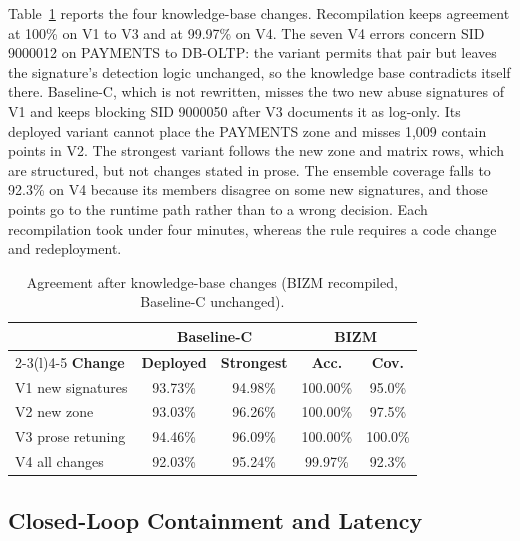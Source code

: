 \documentclass[final,5p]{elsarticle}
\begin{document}
Table~\ref{tab:drift} reports the four knowledge-base changes. Recompilation keeps agreement at 100\% on V1 to V3 and at 99.97\% on V4. The seven V4 errors concern SID 9000012 on PAYMENTS to DB-OLTP: the variant permits that pair but leaves the signature's detection logic unchanged, so the knowledge base contradicts itself there. Baseline-C, which is not rewritten, misses the two new abuse signatures of V1 and keeps blocking SID 9000050 after V3 documents it as log-only. Its deployed variant cannot place the PAYMENTS zone and misses 1,009 contain points in V2. The strongest variant follows the new zone and matrix rows, which are structured, but not changes stated in prose. The ensemble coverage falls to 92.3\% on V4 because its members disagree on some new signatures, and those points go to the runtime path rather than to a wrong decision. Each recompilation took under four minutes, whereas the rule requires a code change and redeployment.

\begin{table}[t]
    \centering
    \caption{Agreement after knowledge-base changes (BIZM recompiled, Baseline-C unchanged).}
    \label{tab:drift}
    \small
    \setlength{\tabcolsep}{2.5pt}
    \begin{tabular}{@{}lcccc@{}}
        \toprule
        & \multicolumn{2}{c}{\textbf{Baseline-C}} & \multicolumn{2}{c}{\textbf{BIZM}} \\
        \cmidrule(lr){2-3}\cmidrule(l){4-5}
        \textbf{Change} & \textbf{Deployed} & \textbf{Strongest} & \textbf{Acc.} & \textbf{Cov.} \\
        \midrule
        V1 new signatures   & 93.73\% & 94.98\% & 100.00\% & 95.0\%  \\
        V2 new zone         & 93.03\% & 96.26\% & 100.00\% & 97.5\%  \\
        V3 prose retuning   & 94.46\% & 96.09\% & 100.00\% & 100.0\% \\
        V4 all changes      & 92.03\% & 95.24\% & 99.97\%  & 92.3\%  \\
        \bottomrule
    \end{tabular}
\end{table}

\subsection{Closed-Loop Containment and Latency}
\label{sec:functional_latency}
\end{document}
